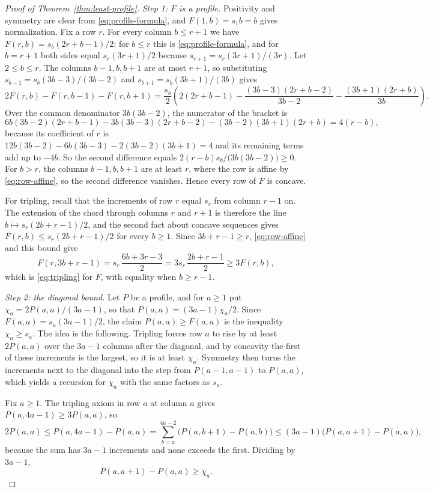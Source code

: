 \begin{proof}[Proof of Theorem~\ref{thm:least-profile}]
\emph{Step 1: \(F\) is a profile.}
Positivity and symmetry are clear from \eqref{eq:profile-formula}, and
\(F(1,b)=s_1b=b\) gives normalization. Fix a row \(r\). For every column
\(b\le r+1\) we have \(F(r,b)=s_b(2r+b-1)/2\): for \(b\le r\) this is
\eqref{eq:profile-formula}, and for \(b=r+1\) both sides equal
\(s_r(3r+1)/2\) because \(s_{r+1}=s_r(3r+1)/(3r)\). Let
\(2\le b\le r\). The columns \(b-1,b,b+1\) are at most \(r+1\), so
substituting \(s_{b-1}=s_b(3b-3)/(3b-2)\) and \(s_{b+1}=s_b(3b+1)/(3b)\)
gives
\[
 2F(r,b)-F(r,b-1)-F(r,b+1)
 =\frac{s_b}2\left(2(2r+b-1)-\frac{(3b-3)(2r+b-2)}{3b-2}
   -\frac{(3b+1)(2r+b)}{3b}\right).
\]
Over the common denominator \(3b(3b-2)\), the numerator of the bracket is
\[
 6b(3b-2)(2r+b-1)-3b(3b-3)(2r+b-2)-(3b-2)(3b+1)(2r+b)=4(r-b),
\]
because its coefficient of \(r\) is
\(12b(3b-2)-6b(3b-3)-2(3b-2)(3b+1)=4\) and its remaining terms add up
to \(-4b\). So the second difference equals
\(2(r-b)s_b/\bigl(3b(3b-2)\bigr)\ge0\). For \(b>r\), the columns
\(b-1,b,b+1\) are at least \(r\), where the row is affine by
\eqref{eq:row-affine}, so the second difference vanishes. Hence every
row of \(F\) is concave.

For tripling, recall that the increments of row \(r\) equal \(s_r\)
from column \(r-1\) on. The extension of the chord through columns \(r\)
and \(r+1\) is therefore the line \(b\mapsto s_r(2b+r-1)/2\), and the
second fact about concave sequences gives
\(F(r,b)\le s_r(2b+r-1)/2\) for every \(b\ge1\). Since \(3b+r-1\ge r\),
\eqref{eq:row-affine} and this bound give
\[
 F(r,3b+r-1)=s_r\,\frac{6b+3r-3}2=3s_r\,\frac{2b+r-1}2\ge3F(r,b),
\]
which is \eqref{eq:tripling} for \(F\), with equality when \(b\ge r-1\).

\emph{Step 2: the diagonal bound.}
Let \(P\) be a profile, and for \(a\ge1\) put
\(\chi_a=2P(a,a)/(3a-1)\), so that \(P(a,a)=(3a-1)\chi_a/2\). Since
\(F(a,a)=s_a(3a-1)/2\), the claim \(P(a,a)\ge F(a,a)\) is the
inequality \(\chi_a\ge s_a\). The idea is the following. Tripling forces
row \(a\) to rise by at least \(2P(a,a)\) over the \(3a-1\) columns after
the diagonal, and by concavity the first of these increments is the
largest, so it is at least \(\chi_a\). Symmetry then turns the
increments next to the diagonal into the step from \(P(a-1,a-1)\) to
\(P(a,a)\), which yields a recursion for \(\chi_a\) with the same
factors as \(s_a\).

Fix \(a\ge1\). The tripling axiom in row \(a\) at column \(a\) gives
\(P(a,4a-1)\ge3P(a,a)\), so
\[
 2P(a,a)\le P(a,4a-1)-P(a,a)
 =\sum_{b=a}^{4a-2}\bigl(P(a,b+1)-P(a,b)\bigr)
 \le(3a-1)\bigl(P(a,a+1)-P(a,a)\bigr),
\]
because the sum has \(3a-1\) increments and none exceeds the first.
Dividing by \(3a-1\),
\begin{equation}\label{eq:diagonal-increment}
 P(a,a+1)-P(a,a)\ge\chi_a.
\end{equation}


\end{proof}
